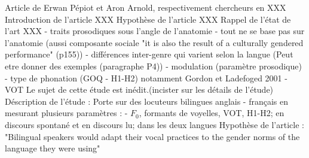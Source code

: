 Article de Erwan Pépiot et Aron Arnold, respectivement chercheurs en XXX
Introduction de l'article XXX
Hypothèse de l'article XXX
Rappel de l'état de l'art XXX
- traits prosodiques sous l'angle de l'anatomie
- tout ne se base pas sur l'anatomie (aussi composante sociale "it is also the result of a culturally gendered performance" (p155))
- différences inter-genre qui varient selon la langue (Peut etre donner des exemples (paragraphe P4))
- modulation (paramètre prosodique)
- type de phonation (GOQ - H1-H2)
   notamment Gordon et Ladefoged 2001
- VOT
Le sujet de cette étude est inédit.(incister sur les détails de l'étude)
Déscription de l'étude :
   Porte sur des locuteurs bilingues anglais - français en mesurant plusieurs paramètres :
      - $F_0$, formants de voyelles, VOT, H1-H2; en discours spontané et en discours lu; dans les deux langues
Hypothèse de l'article : 
"Bilingual speakers would adapt their vocal practices to the gender norms of the language they were using"

